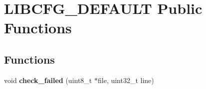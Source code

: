 \hypertarget{group___l_i_b_c_f_g___d_e_f_a_u_l_t___public___functions}{\section{\-L\-I\-B\-C\-F\-G\-\_\-\-D\-E\-F\-A\-U\-L\-T \-Public \-Functions}
\label{group___l_i_b_c_f_g___d_e_f_a_u_l_t___public___functions}
}
\subsection*{\-Functions}
\begin{DoxyCompactItemize}
\item 
\hypertarget{group___l_i_b_c_f_g___d_e_f_a_u_l_t___public___functions_ga6710da8d2be32734dbeff7972d806d5d}{void {\bfseries check\-\_\-failed} (uint8\-\_\-t $\ast$file, uint32\-\_\-t line)}\label{group___l_i_b_c_f_g___d_e_f_a_u_l_t___public___functions_ga6710da8d2be32734dbeff7972d806d5d}

\end{DoxyCompactItemize}

